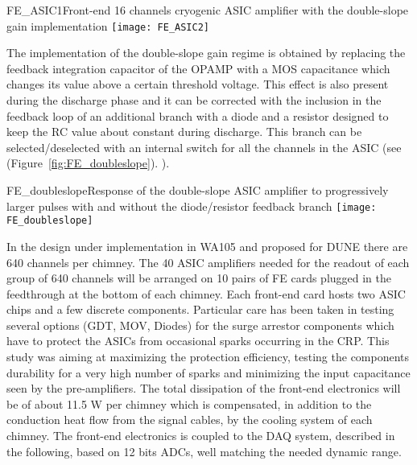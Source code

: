 \begin{cdrfigure}{FE_ASIC1}{Front-end 16 channels cryogenic ASIC amplifier with the double-slope gain implementation}
\texttt{[image: FE\_ASIC2]}
\end{cdrfigure}

The implementation of the double-slope gain regime is obtained by replacing the feedback integration capacitor of the OPAMP with a MOS capacitance which changes its value above a certain threshold voltage. This effect is also present during the discharge phase and it can be corrected with the inclusion in the feedback loop of an additional branch with a diode and a resistor designed to  keep the RC value about constant during discharge. This branch  can be selected/deselected with an internal switch for all the channels in the ASIC (see  (Figure~\ref{fig:FE_doubleslope}). ).

\begin{cdrfigure}{FE_doubleslope}{Response of the double-slope ASIC amplifier to progressively larger pulses with and without the diode/resistor feedback branch}
\texttt{[image: FE\_doubleslope]}
\end{cdrfigure}

In the design under implementation in WA105 and proposed for DUNE there are 640 channels per chimney. The 40 ASIC amplifiers needed for the readout of each group of 640 channels will be arranged on 10 pairs of FE cards plugged in the feedthrough at the bottom of each chimney.  Each front-end card hosts two ASIC chips and a few discrete components. Particular care has been taken in testing several options (GDT, MOV, Diodes) for the surge arrestor components which have to protect the ASICs from occasional sparks occurring in the CRP.  This study was aiming at maximizing the protection efficiency, testing the components durability for a very high number of sparks and minimizing the input capacitance seen by the pre-amplifiers. The total dissipation of the front-end electronics will be of about 11.5 W per chimney which is compensated, in addition to the conduction heat flow from the signal cables, by the cooling system of each chimney.  The front-end electronics is coupled to the DAQ system, described in the following, based on 12 bits ADCs, well matching the needed dynamic range.

